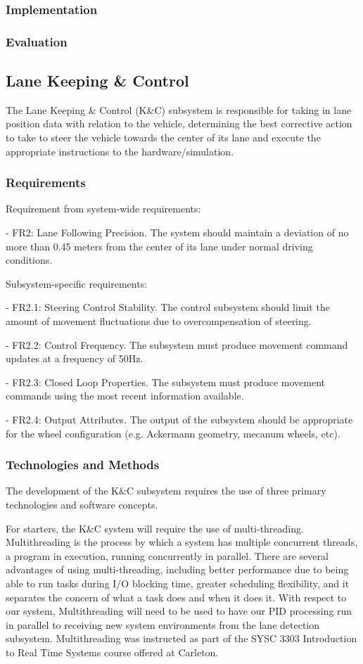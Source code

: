 \documentclass[titlepage]{article}
\begin{document}
\subsubsection{Implementation}
\subsubsection{Evaluation}

\subsection{Lane Keeping \& Control}
The Lane Keeping \& Control (K\&C) subsystem is responsible for taking in lane position data with relation to the vehicle, determining the best corrective action to take to steer the vehicle towards the center of its lane and execute the appropriate instructions to the hardware/simulation.

\subsubsection{Requirements}
Requirement from system-wide requirements:

- FR2: Lane Following Precision. The system should maintain a deviation of no more than 0.45 meters from the center of its lane under normal driving conditions.

Subsystem-specific requirements:

- FR2.1: Steering Control Stability.
The control subsystem should limit the amount of movement fluctuations due to overcompensation of steering.

- FR2.2: Control Frequency.
The subsystem must produce movement command updates at a frequency of 50Hz.

- FR2.3: Closed Loop Properties.
The subsystem must produce movement commands using the most recent information available.

- FR2.4: Output Attributes.
The output of the subsystem should be appropriate for the wheel configuration (e.g. Ackermann geometry, mecanum wheels, etc). 

\subsubsection{Technologies and Methods}
The development of the K\&C subsystem requires the use of three primary technologies and software concepts. 

For starters, the K\&C system will require the use of multi-threading. Multithreading is the process by which a system has multiple concurrent threads, a program in execution, running concurrently in parallel. There are several advantages of using multi-threading, including better performance due to being able to run tasks during I/O blocking time, greater scheduling flexibility, and it separates the concern of what a task does and when it does it. With respect to our system, Multithreading will need to be used to have our PID processing run in parallel to receiving new system environments from the lane detection subsystem. Multithreading was instructed as part of the SYSC 3303 Introduction to Real Time Systems course offered at Carleton. 
\end{document}

